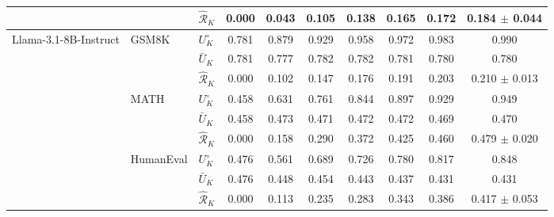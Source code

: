 \begin{table}[t]
\begin{tabular}{lll *{7}{c}}
 &  & $\hat{\mathcal R}_K$ & \cellcolor{colRVR!0}0.000 & \cellcolor{colRVR!3}0.043 & \cellcolor{colRVR!6}0.105 & \cellcolor{colRVR!8}0.138 & \cellcolor{colRVR!10}0.165 & \cellcolor{colRVR!10}0.172 & \cellcolor{colRVR!11}0.184 $\pm$ 0.044 \\
\midrule
\multirow{9}{*}{Llama-3.1-8B-Instruct} & \multirow{3}{*}{GSM8K} & $U^\circ_K$ & \cellcolor{colREU!47}0.781 & \cellcolor{colREU!53}0.879 & \cellcolor{colREU!56}0.929 & \cellcolor{colREU!57}0.958 & \cellcolor{colREU!58}0.972 & \cellcolor{colREU!59}0.983 & \cellcolor{colREU!59}0.990 \\
 &  & $\bar U_K$ & \cellcolor{colAEU!47}0.781 & \cellcolor{colAEU!47}0.777 & \cellcolor{colAEU!47}0.782 & \cellcolor{colAEU!47}0.782 & \cellcolor{colAEU!47}0.781 & \cellcolor{colAEU!47}0.780 & \cellcolor{colAEU!47}0.780 \\
 &  & $\hat{\mathcal R}_K$ & \cellcolor{colRVR!0}0.000 & \cellcolor{colRVR!6}0.102 & \cellcolor{colRVR!9}0.147 & \cellcolor{colRVR!11}0.176 & \cellcolor{colRVR!11}0.191 & \cellcolor{colRVR!12}0.203 & \cellcolor{colRVR!13}0.210 $\pm$ 0.013 \\
\cmidrule(l){2-10}
 & \multirow{3}{*}{MATH} & $U^\circ_K$ & \cellcolor{colREU!27}0.458 & \cellcolor{colREU!38}0.631 & \cellcolor{colREU!46}0.761 & \cellcolor{colREU!51}0.844 & \cellcolor{colREU!54}0.897 & \cellcolor{colREU!56}0.929 & \cellcolor{colREU!57}0.949 \\
 &  & $\bar U_K$ & \cellcolor{colAEU!27}0.458 & \cellcolor{colAEU!28}0.473 & \cellcolor{colAEU!28}0.471 & \cellcolor{colAEU!28}0.472 & \cellcolor{colAEU!28}0.472 & \cellcolor{colAEU!28}0.469 & \cellcolor{colAEU!28}0.470 \\
 &  & $\hat{\mathcal R}_K$ & \cellcolor{colRVR!0}0.000 & \cellcolor{colRVR!9}0.158 & \cellcolor{colRVR!17}0.290 & \cellcolor{colRVR!22}0.372 & \cellcolor{colRVR!26}0.425 & \cellcolor{colRVR!28}0.460 & \cellcolor{colRVR!29}0.479 $\pm$ 0.020 \\
\cmidrule(l){2-10}
 & \multirow{3}{*}{HumanEval} & $U^\circ_K$ & \cellcolor{colREU!29}0.476 & \cellcolor{colREU!34}0.561 & \cellcolor{colREU!41}0.689 & \cellcolor{colREU!44}0.726 & \cellcolor{colREU!47}0.780 & \cellcolor{colREU!49}0.817 & \cellcolor{colREU!51}0.848 \\
 &  & $\bar U_K$ & \cellcolor{colAEU!29}0.476 & \cellcolor{colAEU!27}0.448 & \cellcolor{colAEU!27}0.454 & \cellcolor{colAEU!27}0.443 & \cellcolor{colAEU!26}0.437 & \cellcolor{colAEU!26}0.431 & \cellcolor{colAEU!26}0.431 \\
 &  & $\hat{\mathcal R}_K$ & \cellcolor{colRVR!0}0.000 & \cellcolor{colRVR!7}0.113 & \cellcolor{colRVR!14}0.235 & \cellcolor{colRVR!17}0.283 & \cellcolor{colRVR!21}0.343 & \cellcolor{colRVR!23}0.386 & \cellcolor{colRVR!25}0.417 $\pm$ 0.053 \\
\bottomrule
\end{tabular}
\end{table}